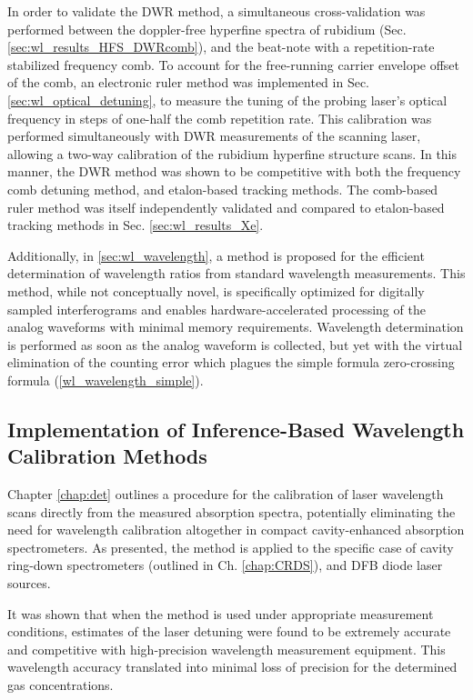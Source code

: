 \documentclass[12pt]{report}
\begin{document}
	In order to validate the DWR method, a simultaneous cross-validation was performed between the doppler-free hyperfine spectra of rubidium (Sec. \ref{sec:wl_results_HFS_DWRcomb}), and the beat-note with a repetition-rate stabilized frequency comb. To account for the free-running carrier envelope offset of the comb, an electronic ruler method was implemented in Sec. \ref{sec:wl_optical_detuning}, to measure the tuning of the probing laser's optical frequency in steps of one-half the comb repetition rate. This calibration was performed simultaneously with DWR measurements of the scanning laser, allowing a two-way calibration of the rubidium hyperfine structure scans. In this manner, the DWR method was shown to be competitive with both the frequency comb detuning method, and etalon-based tracking methods. The comb-based ruler method was itself independently validated and compared to etalon-based tracking methods in Sec. \ref{sec:wl_results_Xe}.
	
	Additionally, in \ref{sec:wl_wavelength}, a method is proposed for the efficient determination of wavelength ratios from standard wavelength measurements. This method, while not conceptually novel, is specifically optimized for digitally sampled interferograms and enables hardware-accelerated processing of the analog waveforms with minimal memory requirements. Wavelength determination is performed as soon as the analog waveform is collected, but yet with the virtual elimination of the counting error which plagues the simple formula zero-crossing formula (\ref{wl_wavelength_simple}).
	
	\subsection{Implementation of Inference-Based Wavelength Calibration Methods}
	Chapter \ref{chap:det} outlines a procedure for the calibration of laser wavelength scans directly from the measured absorption spectra, potentially eliminating the need for wavelength calibration altogether in compact cavity-enhanced absorption spectrometers. As presented, the method is applied to the specific case of cavity ring-down spectrometers (outlined in Ch. \ref{chap:CRDS}), and DFB diode laser sources.
	
	It was shown that when the method is used under appropriate measurement conditions, estimates of the laser detuning were found to be extremely accurate and competitive with high-precision wavelength measurement equipment. This wavelength accuracy translated into minimal loss of precision for the determined gas concentrations.
	
\end{document}
